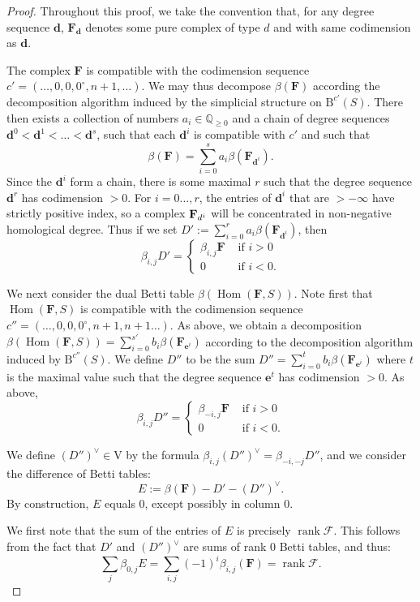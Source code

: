 \documentclass[12pt]{amsart}
\theoremstyle{definition}
\theoremstyle{remark}
\newcommand{\Hom}{\operatorname{Hom}} %
\newcommand{\rank}{\operatorname{rank}}
\newcommand{\QQ}{\mathbb{Q}}
\newcommand{\VV}{\mathrm{V}}
\newcommand{\cc}{c}
\newcommand{\dd}{\mathbf{d}}
\newcommand{\ee}{\mathbf{e}}
\newcommand{\cF}{\mathcal{F}}
\newcommand{\FF}{\mathbf{F}}
\newcommand{\zp}{\circ}
\newcommand{\BBQ}{\mathrm{B}}
\begin{document}
\begin{proof}
Throughout this proof, we take the convention that, for any degree sequence $\dd$, $\FF_{\dd}$ denotes some pure complex of type $d$ and with same codimension as $\dd$.

The complex $\FF$ is compatible with the codimension sequence $\cc'=(\dots,0,0,0^{\zp},n+1,\dots)$. We may thus decompose $\beta(\FF)$ according the decomposition algorithm induced by the simplicial structure on $\BBQ^{\cc'}(S)$.  There then exists a collection of numbers $a_i\in \QQ_{\geq 0}$ and a chain of degree sequences $\dd^0<\dd^1<\dots <\dd^s$, such that each $\dd^i$ is compatible with $\cc'$ and such that
\[
\beta(\FF)=\sum_{i=0}^s a_i\beta(\FF_{\dd^i}).
\]
Since the $\dd^i$ form a chain, there is some maximal $r$ such that the degree sequence $\dd^r$ has codimension $>0$.  For $i=0\dots,r$, the entries of $\dd^{i}$ that are $>-\infty$ have strictly positive index, so a complex $\FF_{\\d^{i}}$ will be concentrated in non-negative 
homological degree. Thus if we set $D':=\sum_{i=0}^r a_i\beta(\FF_{\dd^i})$, then 
\[
\beta_{i,j}D'=\begin{cases}
\beta_{i,j}\FF &\text{ if } i>0\\
0 & \text{ if } i<0.
\end{cases}
\]

We next consider the dual Betti table $\beta(\Hom(\FF,S))$.  Note first that $\Hom(\FF,S)$ is compatible with the codimension sequence $\cc''=(\dots,0,0,0^{\zp},n+1,n+1\dots)$.  As above, we obtain a decomposition $\beta(\Hom(\FF,S))=\sum_{i=0}^{s'} b_i\beta(\FF_{\ee^i})$ according to the decomposition algorithm induced by $\BBQ^{\cc''}(S)$.  We define $D''$ to be the sum $D''=\sum_{i=0}^{t} b_i\beta(\FF_{\ee^i})$ where $t$ is the maximal value such that the degree sequence $\ee^t$ has codimension $>0$.  
As above, 
\[
\beta_{i,j}D''=\begin{cases}
\beta_{-i,j}\FF &\text{ if } i>0\\
0 & \text{ if } i<0.
\end{cases}
\]

We define $(D'')^\vee\in \VV$ by the formula $\beta_{i,j}(D'')^\vee=\beta_{-i,-j}D''$, and we consider the difference of Betti tables:
\[
E:=\beta(\FF)-D'-(D'')^\vee.
\]
By construction, $E$ equals $0$, except possibly in column $0$.  

We first note that the sum of the entries of $E$ is precisely $\rank \cF$.  This follows from the fact that $D'$ and $(D'')^\vee$ are sums of rank $0$ Betti tables, and thus:
\[
\sum_j \beta_{0,j} E= \sum_{i,j} (-1)^i\beta_{i,j}(\FF)=\rank \cF.
\]


\end{proof}
\end{document}
